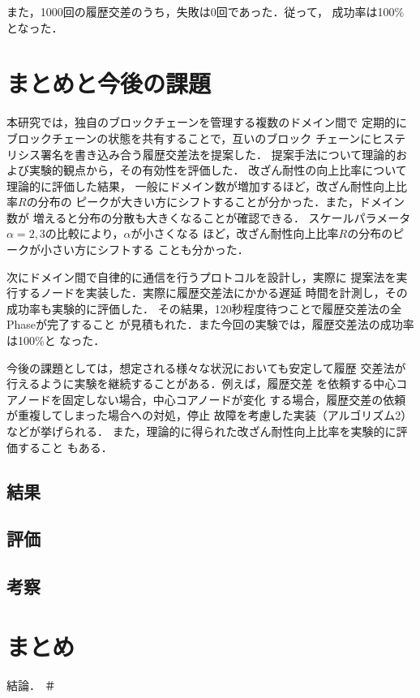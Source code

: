 \documentclass[a4paper,12pt]{jsarticle}
\begin{document}
また，1000回の履歴交差のうち，失敗は0回であった．従って，
成功率は100\%となった．

\newpage
\section{まとめと今後の課題}

本研究では，独自のブロックチェーンを管理する複数のドメイン間で
定期的にブロックチェーンの状態を共有することで，互いのブロック
チェーンにヒステリシス署名を書き込み合う履歴交差法を提案した．
提案手法について理論的および実験的観点から，その有効性を評価した．
改ざん耐性の向上比率について理論的に評価した結果，
一般にドメイン数が増加するほど，改ざん耐性向上比率$R$の分布の
ピークが大きい方にシフトすることが分かった．また，ドメイン数が
増えると分布の分散も大きくなることが確認できる．
スケールパラメータ$\alpha=2,3$の比較により，$\alpha$が小さくなる
ほど，改ざん耐性向上比率$R$の分布のピークが小さい方にシフトする
ことも分かった．

次にドメイン間で自律的に通信を行うプロトコルを設計し，実際に
提案法を実行するノードを実装した．実際に履歴交差法にかかる遅延
時間を計測し，その成功率も実験的に評価した．
その結果，120秒程度待つことで履歴交差法の全Phaseが完了すること
が見積もれた．また今回の実験では，履歴交差法の成功率は100\%と
なった．

今後の課題としては，想定される様々な状況においても安定して履歴
交差法が行えるように実験を継続することがある．例えば，履歴交差
を依頼する中心コアノードを固定しない場合，中心コアノードが変化
する場合，履歴交差の依頼が重複してしまった場合への対処，停止
故障を考慮した実装（アルゴリズム2）などが挙げられる．
また，理論的に得られた改ざん耐性向上比率を実験的に評価すること
もある．


\subsection{結果}
\subsection{評価}
\subsection{考察}
\newpage
\section{まとめ}
結論．
＃
\end{document}
